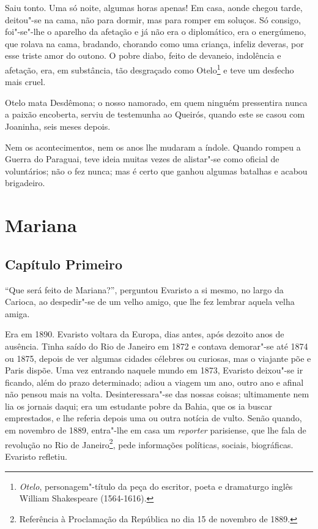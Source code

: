 Saiu tonto. Uma só noite, algumas horas apenas! Em casa, aonde chegou
tarde, deitou"-se na cama, não para dormir, mas para romper em soluços.
Só consigo, foi"-se"-lhe o aparelho da afetação e já não era o
diplomático, era o energúmeno, que rolava na cama, bradando, chorando
como uma criança, infeliz deveras, por esse triste amor do outono. O
pobre diabo, feito de devaneio, indolência e afetação, era, em
substância, tão desgraçado como Otelo\footnote{\emph{Otelo},
  personagem"-título da peça do escritor, poeta e dramaturgo inglês
  William Shakespeare (1564-1616).} e teve um
desfecho mais cruel.

Otelo mata Desdêmona; o nosso namorado, em quem ninguém pressentira
nunca a paixão encoberta, serviu de testemunha ao Queirós, quando este
se casou com Joaninha, seis meses depois.

Nem os acontecimentos, nem os anos lhe mudaram a índole. Quando rompeu a
Guerra do Paraguai, teve ideia muitas vezes de alistar"-se como oficial
de voluntários; não o fez nunca; mas é certo que ganhou algumas batalhas
e acabou brigadeiro.

\chapter{Mariana}

\section{Capítulo Primeiro}

``Que será feito de Mariana?'', perguntou Evaristo a si mesmo, no largo
da Carioca, ao despedir"-se de um velho amigo, que lhe fez lembrar aquela
velha amiga.

Era em 1890. Evaristo voltara da Europa, dias antes, após dezoito anos
de ausência. Tinha saído do Rio de Janeiro em 1872 e contava demorar"-se
até 1874 ou 1875, depois de ver algumas cidades célebres ou curiosas,
mas o viajante põe e Paris dispõe. Uma vez entrando naquele mundo em
1873, Evaristo deixou"-se ir ficando, além do prazo determinado; adiou a
viagem um ano, outro ano e afinal não pensou mais na volta.
Desinteressara"-se das nossas coisas; ultimamente nem lia os jornais
daqui; era um estudante pobre da Bahia, que os ia buscar emprestados, e
lhe referia depois uma ou outra notícia de vulto. Senão quando, em
novembro de 1889, entra"-lhe em casa um \emph{reporter} parisiense, que
lhe fala de revolução no Rio de Janeiro\footnote{Referência à
  Proclamação da República no dia 15 de novembro de 1889.}, pede
informações políticas, sociais, biográficas. Evaristo refletiu.


